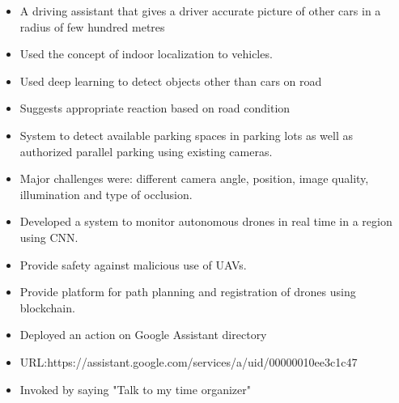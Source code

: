 \begin{itemize}
\item A driving assistant that gives a driver accurate picture of other cars in a radius of few hundred metres
\item Used the concept of indoor localization to \newline vehicles.
\item Used deep learning to detect objects other than cars on road 
\item Suggests appropriate reaction based on road condition
\end{itemize}


\smallskip


\begin{itemize}
\item System to detect available parking spaces in parking lots as well as authorized parallel parking using existing cameras.
\item Major challenges were: different camera angle, position, image quality, illumination and type of occlusion.
\end{itemize}

\smallskip

\begin{itemize}
\item Developed a system to monitor autonomous drones in real time in a region using CNN.
\item Provide safety against malicious use of UAVs.
\item Provide platform for path planning and registration of drones using blockchain. 
\end{itemize}

\smallskip

\begin{itemize}
\item Deployed an action on Google Assistant \newline directory
\item URL:https://assistant.google.com/services\newline/a/uid/00000010ee3c1c47
\item Invoked by saying "Talk to my time organizer"
\end{itemize}

\cvproject{}